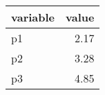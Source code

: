 \begin{tabular}{lr}
  \hline
variable & value \\ 
  \hline
p1 & 2.17 \\ 
  p2 & 3.28 \\ 
  p3 & 4.85 \\ 
   \hline
\end{tabular}
